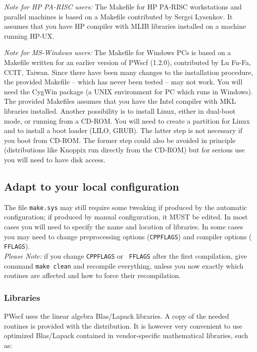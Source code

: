 \documentclass[12pt]{article}
\begin{document}
{\em Note for HP PA-RISC users:} 
The Makefile for HP PA-RISC workstations and parallel machines is based
on a Makefile contributed by Sergei Lysenkov.  It assumes that you have
HP compiler with MLIB libraries installed on a machine running HP-UX.

{\em Note for MS-Windows users:} 
The Makefile for Windows PCs is based on a Makefile written for an
earlier version of PWscf (1.2.0), contributed by Lu Fu-Fa, CCIT,
Taiwan. Since there have been many changes to the installation
procedure, the provided Makefile -- which has never been tested -- may
not work.  You will need the CygWin package (a UNIX environment for PC
which runs in Windows). The provided Makefiles assumes that you have the
Intel compiler with MKL libraries installed.  Another possibility is to
install Linux, either in dual-boot mode, or running from a CD-ROM. 
You will need to create a partition for Linux and to install a
boot loader (LILO, GRUB). The latter step is not necessary if 
you boot from CD-ROM. The former step could also be avoided in
principle (distributions like Knoppix run directly from the CD-ROM) 
but for serious use you will need to have disk access.

\subsection{Adapt to your local configuration}

The file {\tt make.sys} may still require some tweaking if produced by
the automatic configuration; if produced by manual configuration, it
MUST be edited. In most cases you will need to specify the name and
location of libraries. In some cases you may need to change
preprocessing options ({\tt CPPFLAGS}) and compiler options ({\tt
FFLAGS}).\\ {\em Please Note:} if you change {\tt CPPFLAGS} or {\tt
FFLAGS} after the first compilation, give command {\tt make clean} and
recompile everything, unless you now exactly which routines are affected
and how to force their recompilation.

\subsubsection{Libraries}

PWscf uses the linear algebra Blas/Lapack libraries. A copy of the
needed routines is provided with the distribution. It is however very
convenient to use optimized Blas/Lapack contained in vendor-specific
mathematical libraries, such as:
\end{document}
